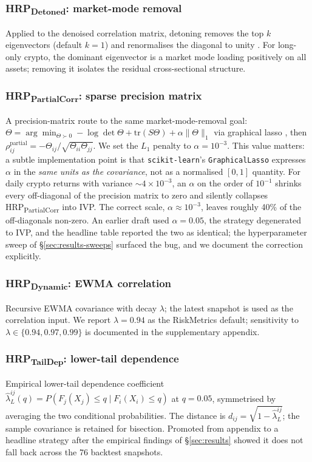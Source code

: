 \documentclass[11pt,a4paper]{article}
\begin{document}
\subsubsection{HRP\textsubscript{Detoned}: market-mode removal}
Applied to the denoised correlation matrix, detoning removes the top
$k$ eigenvectors (default $k=1$) and renormalises the diagonal to
unity \citep{lopezdeprado2020mlam}. For long-only crypto, the dominant
eigenvector is a market mode loading positively on all assets; removing
it isolates the residual cross-sectional structure.

\subsubsection{HRP\textsubscript{PartialCorr}: sparse precision matrix}
A precision-matrix route to the same market-mode-removal goal:
$\Theta = \arg\min_{\Theta \succ 0} -\log\det\Theta + \mathrm{tr}(S\Theta)
+ \alpha\|\Theta\|_1$ via graphical lasso \citep{friedman2008glasso},
then $\rho_{ij}^{\mathrm{partial}} = -\Theta_{ij}/\sqrt{\Theta_{ii}\Theta_{jj}}$.
We set the $L_1$ penalty to $\alpha = 10^{-3}$. This value matters: a
subtle implementation point is that \texttt{scikit-learn}'s
\texttt{GraphicalLasso} expresses $\alpha$ in the \emph{same units as the
covariance}, not as a normalised $[0,1]$ quantity. For daily crypto
returns with variance $\sim$$4\times10^{-3}$, an $\alpha$ on the order of
$10^{-1}$ shrinks every off-diagonal of the precision matrix to zero and
silently collapses HRP\textsubscript{PartialCorr} into IVP. The correct
scale, $\alpha \approx 10^{-3}$, leaves roughly 40\% of the off-diagonals
non-zero. An earlier draft used $\alpha = 0.05$, the strategy degenerated
to IVP, and the headline table reported the two as identical; the
hyperparameter sweep of \S\ref{sec:results-sweeps} surfaced the bug, and
we document the correction explicitly.

\subsubsection{HRP\textsubscript{Dynamic}: EWMA correlation}
Recursive EWMA covariance with decay $\lambda$; the latest snapshot is
used as the correlation input. We report $\lambda = 0.94$ as the
RiskMetrics default; sensitivity to $\lambda \in \{0.94, 0.97, 0.99\}$
is documented in the supplementary appendix.

\subsubsection{HRP\textsubscript{TailDep}: lower-tail dependence}
Empirical lower-tail dependence coefficient $\hat\lambda_L^{ij}(q) =
P(F_j(X_j) \leq q \mid F_i(X_i) \leq q)$ at $q = 0.05$, symmetrised by
averaging the two conditional probabilities. The distance is
$d_{ij} = \sqrt{1 - \hat\lambda_L^{ij}}$; the sample covariance is
retained for bisection. Promoted from appendix to a headline strategy
after the empirical findings of \S\ref{sec:results} showed it does not
fall back across the 76 backtest snapshots.
\end{document}
